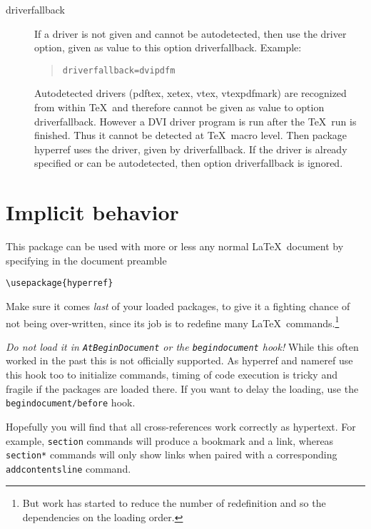 \documentclass{article}
\newcommand*{\xpackage}[1]{\textsf{#1}}
\newcommand{\bs}{\symbol{'134}}%
\newcommand{\ci}[1]{\texttt{\bs#1}}
\begin{document}
\begin{description}
\item[driverfallback]
  If a driver is not given and cannot be autodetected, then use
  the driver option, given as value to this option \textsf{driverfallback}.
  Example:
  \begin{quote}
    \texttt{driverfallback=dvipdfm}
  \end{quote}
  Autodetected drivers (\textsf{pdftex}, \textsf{xetex}, \textsf{vtex},
  \textsf{vtexpdfmark}) are recognized from within \TeX\ and
  therefore cannot be given as value to option \textsf{driverfallback}.
  However a DVI driver program is run after the \TeX\ run is finished.
  Thus it cannot be detected at \TeX\ macro level. Then package
  \xpackage{hyperref}
  uses the driver, given by \textsf{driverfallback}. If the driver
  is already specified or can be autodetected, then option
  \textsf{driverfallback} is ignored.
\end{description}

\section{Implicit behavior}

This package can be used with more or less any normal \LaTeX\ document
by specifying in the document preamble

\begin{verbatim}
\usepackage{hyperref}
\end{verbatim}

Make sure it comes \emph{last} of your loaded packages, to give it a
fighting chance of not being over-written, since its job is to redefine
many \LaTeX\ commands.\footnote{But work has started to reduce the
number of redefinition and so the dependencies on the loading order.}

\emph{Do not load it in \ci{AtBeginDocument} or the \texttt{begindocument} hook!}
While this often worked in the past this is not officially supported.
As \xpackage{hyperref} and \xpackage{nameref} use this hook too to initialize commands,
timing of code execution is tricky and fragile if the packages are loaded there.
If you want to delay the loading, use the \texttt{begindocument/before} hook.

Hopefully you will find that all cross-references
work correctly as hypertext. For example, \ci{section} commands will
produce a bookmark and a link, whereas \ci{section*} commands will only
show links when paired with a corresponding \ci{addcontentsline}
command.
\end{document}
